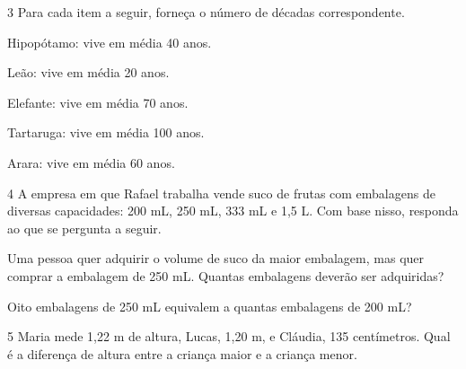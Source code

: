 
\num{3} Para cada item a seguir, forneça o número de décadas correspondente.

\begin{escolha}
\item Hipopótamo: vive em média 40 anos.


\item Leão: vive em média 20 anos.

\item Elefante: vive em média 70 anos.

\item Tartaruga: vive em média 100 anos.

\item Arara: vive em média 60 anos.
\end{escolha}

\num{4} A empresa em que Rafael trabalha vende suco de frutas com embalagens de
diversas capacidades: 200 mL, 250 mL, 333 mL e 1,5 L. Com base nisso, responda ao que se pergunta a seguir.

\begin{escolha}
\item Uma pessoa quer adquirir o volume de suco da maior embalagem,
  mas quer comprar a embalagem de 250 mL. Quantas embalagens deverão ser adquiridas?

\item Oito embalagens de 250 mL equivalem a quantas embalagens de 200 mL?
\end{escolha}


\num{5} Maria mede 1,22 m de altura, Lucas, 1,20 m, e Cláudia, 135 centímetros. 
Qual é a diferença de altura entre a criança maior e a criança menor. 

